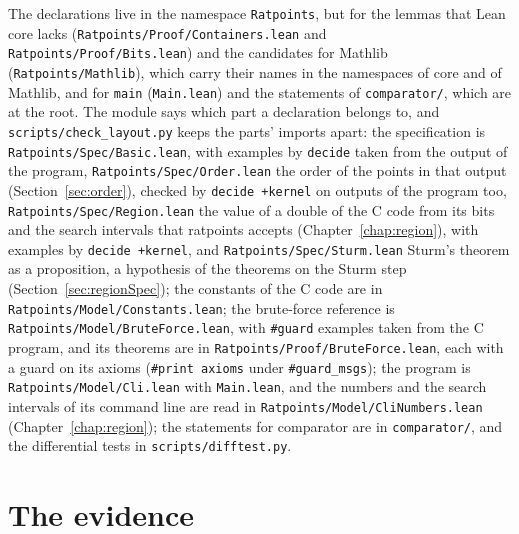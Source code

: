 The declarations live in the namespace \verb|Ratpoints|, but for the lemmas that Lean core lacks
(\verb|Ratpoints/Proof/Containers.lean| and \verb|Ratpoints/Proof/Bits.lean|) and the candidates for
Mathlib (\verb|Ratpoints/Mathlib|), which carry their names in the namespaces of core and of
Mathlib, and for \verb|main| (\verb|Main.lean|) and the statements of \verb|comparator/|, which are
at the root. The module says which part a declaration belongs to, and \verb|scripts/check_layout.py|
keeps the parts' imports apart: the specification is \verb|Ratpoints/Spec/Basic.lean|, with examples
by \verb|decide| taken from the output of the program, \verb|Ratpoints/Spec/Order.lean| the order of
the points in that output (Section~\ref{sec:order}), checked by \verb|decide +kernel| on outputs of
the program too, \verb|Ratpoints/Spec/Region.lean| the value of a double of the C code from its bits
and the search intervals that ratpoints accepts (Chapter~\ref{chap:region}), with examples by
\verb|decide +kernel|, and \verb|Ratpoints/Spec/Sturm.lean| Sturm's theorem as a proposition, a
hypothesis of the theorems on the Sturm step (Section~\ref{sec:regionSpec}); the constants of the C
code are in \verb|Ratpoints/Model/Constants.lean|; the brute-force reference is
\verb|Ratpoints/Model/BruteForce.lean|, with \verb|#guard| examples taken from the C program, and
its theorems are in \verb|Ratpoints/Proof/BruteForce.lean|, each with a guard on its axioms
(\verb|#print axioms| under \verb|#guard_msgs|); the program is \verb|Ratpoints/Model/Cli.lean| with
\verb|Main.lean|, and the numbers and the search intervals of its command line are read in
\verb|Ratpoints/Model/CliNumbers.lean| (Chapter~\ref{chap:region}); the statements for comparator
are in \verb|comparator/|, and the differential tests in \verb|scripts/difftest.py|.

\section{The evidence}\label{sec:spec-evidence}

